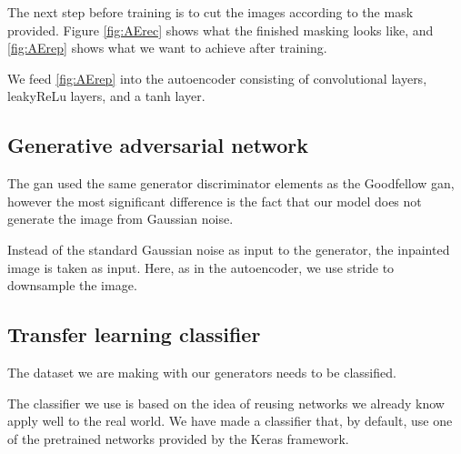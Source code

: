 The next step before training is to cut the images according to the mask provided. Figure \ref{fig:AErec} shows what the finished masking looks like, and \ref{fig:AErep} shows what we want to achieve after training.

We feed \ref{fig:AErep} into the autoencoder consisting of convolutional layers, leakyReLu layers, and a tanh layer.


\subsection{Generative adversarial network}
The gan used the same generator discriminator elements as the Goodfellow gan, however the most significant difference is the fact that our model does not generate the image from Gaussian noise.

Instead of the standard Gaussian noise as input to the generator, the inpainted image is taken as input. Here, as in the autoencoder, we use stride to downsample the image. 





\subsection{Transfer learning classifier}
The dataset we are making with our generators needs to be classified. 

The classifier we use is based on the idea of reusing networks we already know apply well to the real world.
We have made a classifier that, by default, use one of the pretrained networks provided by the Keras framework.

